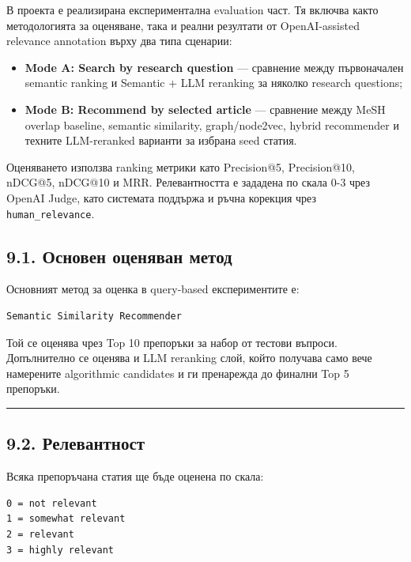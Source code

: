 \documentclass[12pt,a4paper]{article}
\providecommand{\tightlist}{\setlength{\itemsep}{0pt}\setlength{\parskip}{0pt}}
\begin{document}
В проекта е реализирана експериментална evaluation част. Тя включва както методологията за оценяване, така и реални резултати от OpenAI-assisted relevance annotation върху два типа сценарии:

\begin{itemize}
\tightlist
\item
  \textbf{Mode A: Search by research question} --- сравнение между първоначален semantic ranking и Semantic + LLM reranking за няколко research questions;
\item
  \textbf{Mode B: Recommend by selected article} --- сравнение между MeSH overlap baseline, semantic similarity, graph/node2vec, hybrid recommender и техните LLM-reranked варианти за избрана seed статия.
\end{itemize}

Оценяването използва ranking метрики като Precision@5, Precision@10, nDCG@5, nDCG@10 и MRR. Релевантността е зададена по скала 0-3 чрез OpenAI Judge, като системата поддържа и ръчна корекция чрез \texttt{human\_relevance}.

\subsection{9.1. Основен оценяван метод}\label{ux43eux441ux43dux43eux432ux435ux43d-ux43eux446ux435ux43dux44fux432ux430ux43d-ux43cux435ux442ux43eux434}

Основният метод за оценка в query-based експериментите е:

\begin{verbatim}
Semantic Similarity Recommender
\end{verbatim}

Той се оценява чрез Top 10 препоръки за набор от тестови въпроси. Допълнително се оценява и LLM reranking слой, който получава само вече намерените algorithmic candidates и ги пренарежда до финални Top 5 препоръки.

\vspace{0.5em}\hrule\vspace{1.0em}

\subsection{9.2. Релевантност}\label{ux440ux435ux43bux435ux432ux430ux43dux442ux43dux43eux441ux442}

Всяка препоръчана статия ще бъде оценена по скала:

\begin{verbatim}
0 = not relevant
1 = somewhat relevant
2 = relevant
3 = highly relevant
\end{verbatim}
\end{document}
